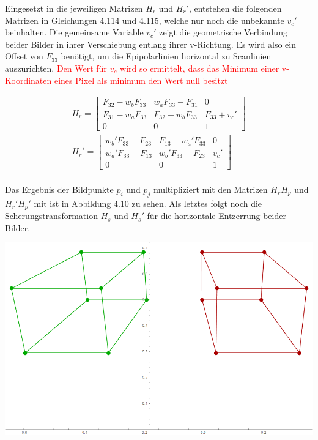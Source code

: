 Eingesetzt in die jeweiligen Matrizen $H_r$ und $H_r'$, entstehen die folgenden Matrizen in Gleichungen 4.114 und 4.115, welche nur noch die unbekannte $v_c'$ beinhalten. Die gemeinsame Variable $v_c'$ zeigt die geometrische Verbindung beider Bilder in ihrer Verschiebung entlang ihrer v-Richtung. Es wird also ein Offset von $F_33$ benötigt, um die Epipolarlinien horizontal zu Scanlinien auszurichten. \textcolor{red}{Den Wert für $v_c$ wird so ermittelt, dass das Minimum einer v-Koordinaten eines Pixel als minimum den Wert null besitzt }

\begin{gather}
	H_r = \begin{bmatrix}
		F_{32}-w_bF_{33}&w_aF_{33}-F_{31}&0\\
		F_{31}-w_aF_{33}&F_{32}-w_bF_{33}&F_{33}+v_c'\\
		0&0&1
	\end{bmatrix}\\
	H_r'=
	\begin{bmatrix}
		w_b'F_{33}-F_{23}&F_{13}-w_a'F_{33}&0\\
		w_a'F_{33}-F_{13}&w_b'F_{33}-F_{23}&v_c'\\
		0&0&1
	\end{bmatrix}
\end{gather}\\

Das Ergebnis der Bildpunkte $p_i$ und $p_j$ multipliziert mit den Matrizen $H_rH_p$ und $H_r'H_p'$ mit ist in Abbildung 4.10 zu sehen. Als letztes folgt noch die Scherungstransformation $H_s$ und $H_s'$ für die horizontale Entzerrung beider Bilder.\\ 

\begin{minipage}{\linewidth}
	\centering
	\includegraphics[width=1.\linewidth]{images/Rectification_HrHp_same_Solutions.png}
\end{minipage}\\ \\

